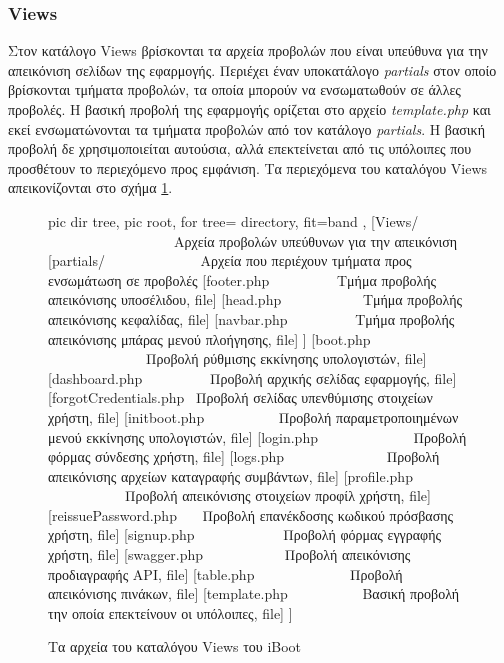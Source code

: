 \subsubsection{Views} \label{ui:app:views}
Στον κατάλογο Views βρίσκονται τα αρχεία προβολών που είναι υπεύθυνα για την απεικόνιση σελίδων της εφαρμογής. Περιέχει έναν υποκατάλογο \emph{partials} στον οποίο βρίσκονται τμήματα προβολών, τα οποία μπορούν να ενσωματωθούν σε άλλες προβολές. Η βασική προβολή της εφαρμογής ορίζεται στο αρχείο \emph{template.php} και εκεί ενσωματώνονται τα τμήματα προβολών από τον κατάλογο \emph{partials}. Η βασική προβολή δε χρησιμοποιείται αυτούσια, αλλά επεκτείνεται από τις υπόλοιπες που προσθέτουν το περιεχόμενο προς εμφάνιση. Τα περιεχόμενα του καταλόγου Views απεικονίζονται στο σχήμα \ref{dir:iBoot-Views}.

\begin{figure}
	\centering
	{\footnotesize
		\begin{forest}
			pic dir tree,
			pic root,
			for tree={%
				directory,
				fit=band
			},
			[Views/ \ \ \ \ \ \ \ \ \ \ \ \ \ \ \ \ \ \ Αρχεία προβολών υπεύθυνων για την απεικόνιση
				[partials/ \ \ \ \ \ \ \ \ \ \ \ \ \ Αρχεία που περιέχουν τμήματα προς ενσωμάτωση σε προβολές
					[footer.php \ \ \ \ \ \ \ \ \ Τμήμα προβολής απεικόνισης υποσέλιδου, file]
					[head.php \ \ \ \ \ \ \ \ \ \ \ Τμήμα προβολής απεικόνισης κεφαλίδας, file]
					[navbar.php \ \ \ \ \ \ \ \ \ Τμήμα προβολής απεικόνισης μπάρας μενού πλοήγησης, file]
				]
				[boot.php \ \ \ \ \ \ \ \ \ \ \ \ \ \ Προβολή ρύθμισης εκκίνησης υπολογιστών, file]
				[dashboard.php \ \ \ \ \ \ \ \ \ Προβολή αρχικής σελίδας εφαρμογής, file]
				[forgotCredentials.php \ Προβολή σελίδας υπενθύμισης στοιχείων χρήστη, file]
				[initboot.php \ \ \ \ \ \ \ \ \ \ Προβολή παραμετροποιημένων μενού εκκίνησης υπολογιστών, file]
				[login.php \ \ \ \ \ \ \ \ \ \ \ \ \ Προβολή φόρμας σύνδεσης χρήστη, file]
				[logs.php \ \ \ \ \ \ \ \ \ \ \ \ \ \ Προβολή απεικόνισης αρχείων καταγραφής συμβάντων, file]
				[profile.php \ \ \ \ \ \ \ \ \ \ \ Προβολή απεικόνισης στοιχείων προφίλ χρήστη, file]
				[reissuePassword.php \ \ \ Προβολή επανέκδοσης κωδικού πρόσβασης χρήστη, file]
				[signup.php \ \ \ \ \ \ \ \ \ \ \ \ Προβολή φόρμας εγγραφής χρήστη, file]
				[swagger.php \ \ \ \ \ \ \ \ \ \ \ Προβολή απεικόνισης προδιαγραφής API, file]
				[table.php \ \ \ \ \ \ \ \ \ \ \ \ \ Προβολή απεικόνισης πινάκων, file]
				[template.php \ \ \ \ \ \ \ \ \ \ Βασική προβολή την οποία επεκτείνουν οι υπόλοιπες, file]
			]
		\end{forest}
	}
	\caption{Τα αρχεία του καταλόγου Views του iBoot}
	\label{dir:iBoot-Views}
\end{figure}
\FloatBarrier

